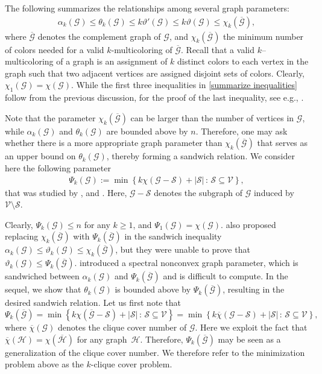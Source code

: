 \documentclass[11pt, a4paper]{article}
\newcommand{\mc}{\mathcal}
\begin{document}
The following summarizes the relationships among several graph parameters:
\begin{align}  \label{summarize inequalities}
    \alpha_k(\mc{G}) \leq \theta_k(\mc{G}) \leq  k \vartheta'(\mc{G}) \leq k \vartheta(\mc{G}) \leq  \chi_k( \overline{\mc{G}}),
\end{align}
where $\overline{\mc{G}}$ denotes the complement graph of $\mc{G}$, and 
$\chi_k(\overline{\mc{G}})$ the minimum number of colors needed for a valid $k$-multicoloring of $ \overline{\mc{G}}$.
Recall that a valid $k$–multicoloring of a graph is an assignment of $k$ distinct colors to each vertex in the graph such that two adjacent vertices are assigned disjoint sets of colors.
Clearly, $\chi_1(\mc{G}) = \chi(\mc{G}).$
While the first three inequalities in \eqref{summarize inequalities} follow from the previous discussion, for the proof of the last inequality, see e.g., \cite{Sinjorgo2022GenVartheta}.

Note that the parameter $\chi_k( \overline{\mc{G}})$ can be larger than the number of vertices in $\mc{G}$, while $\alpha_k(\mc{G})$ and  $\theta_k(\mc{G})$ are bounded above by $n$.
Therefore, one may ask whether there is a more appropriate graph parameter than $\chi_k( \overline{\mc{G}})$ that serves as an upper bound on $\theta_k(\mc{G})$, thereby forming a sandwich relation. 
We consider here the following parameter
\begin{align}\label{Psik}
   \Psi_k({\mc{G}}) := \min \left \{  k  \chi(\mc{G} -\mc{S}) + |\mc{S}| \,:\, \mc{S} \subseteq \mc{V} \right \},
\end{align}
that was studied by \citet{Greene1976}, and \citet{GreeneKleitman1976}.
Here, $\mc{G} - \mc{S}$ denotes the subgraph of $\mc{G}$ induced by $\mc{V} \setminus \mc{S}$.

Clearly, $ \Psi_k({\mc{G}}) \leq n$ for any $k\geq 1$, and $\Psi_1({\mc{G}})=  \chi({\mc{G}})$.
\citet{Narasimhan1989ThesisMkCSProblem} also proposed replacing $\chi_k(\overline{\mc{G}})$ with $\Psi_k(\overline{\mc{G}})$
in the sandwich inequality $\alpha_k(\mc{G}) \leq \vartheta_k(\mc{G}) \leq  \chi_k(\overline{\mc{G}})$, but they were unable to prove that $\vartheta_k({\mc{G}}) \leq  \Psi_k(\overline{\mc{G}})$.
\citet{Oliveira2024} introduced a spectral nonconvex graph parameter, which is sandwiched between $\alpha_k(\mc{G})$ and $\Psi_k( \overline{\mc{G}})$ and is difficult to compute.
In the sequel, we show that $\theta_k(\mc{G})$ is bounded above by  $\Psi_k(\overline{\mc{G}})$, resulting in the desired sandwich relation.
Let us first note that
$$ \Psi_k(\overline{\mc{G}}) =  \min \left \{  k  \chi( \overline{\mc{G}} -\mc{S}) + |\mc{S}| \,:\, \mc{S} \subseteq \mc{V} \right \} = 
\min \left \{  k  \overline{\chi}( {\mc{G} -\mc{S}}) + |\mc{S}| \,:\, \mc{S} \subseteq \mc{V} \right \}, $$
where $\overline{\chi}(\mc{G})$ denotes the clique cover number of $\mc{G}$. 
Here we exploit the fact that $\overline{\chi}(\mc{H}) = \chi(\overline{\mc{H}})$ for any graph~$\mc{H}$.
Therefore, $\Psi_k(\overline{\mc{G}})$ may be seen as a generalization of the clique cover number.
We therefore refer to the minimization problem above as the $k$-clique cover problem.
\end{document}
